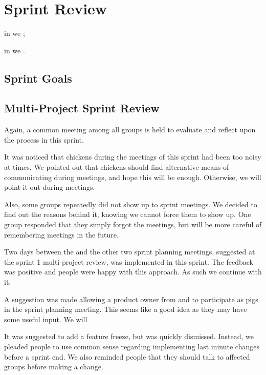 \chapter{Sprint Review}\label{chap:sprint2_end}

\begin{chapterorganization}
  \item in  we ;
  \item in  we .
\end{chapterorganization}

\section{Sprint Goals}\label{sec:s2_goals}



\section{Multi-Project Sprint Review}\label{sec:s2_multiprj_review}
Again, a common meeting among all groups is held to evaluate and reflect upon the process in this sprint.

It was noticed that chickens during the meetings of this sprint had been too noisy at times. We pointed out that chickens should find alternative means of communicating during meetings, and hope this will be enough. Otherwise, we will point it out during meetings.

Also, some groups repeatedly did not show up to sprint meetings. We decided to find out the reasons behind it, knowing we cannot force them to show up. One group responded that they simply forgot the meetings, but will be more careful of remembering meetings in the future.

Two days between the \gui and the other two sprint planning meetings, suggested at the sprint 1 multi-project review, was implemented in this sprint. The feedback was positive and people were happy with this approach. As such we continue with it.

A suggestion was made allowing a product owner from \db and \bd to participate as pigs in the \gui sprint planning meeting. This seems like a good idea as they may have some useful input. We will 

It was suggested to add a feature freeze, but was quickly dismissed. Instead, we pleaded people to use common sense regarding implementing last minute changes before a sprint end. We also reminded people that they should talk to affected groups before making a change.